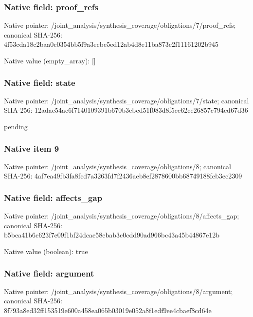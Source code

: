 \documentclass[10pt,a4paper]{article}
\begin{document}
\subsubsection{Native field: proof\_\allowbreak{}refs}
Native pointer: /joint\_\allowbreak{}analysis/synthesis\_\allowbreak{}coverage/obligations/7/proof\_\allowbreak{}refs; canonical SHA-256: 4f53cda18c2baa0c0354bb5f9a3ecbe5ed12ab4d8e11ba873c2f11161202b945

Native value (empty\_\allowbreak{}array): []

\subsubsection{Native field: state}
Native pointer: /joint\_\allowbreak{}analysis/synthesis\_\allowbreak{}coverage/obligations/7/state; canonical SHA-256: 12adac54ac6f7140109391b670b3cbcd51f083d8f5ee62ce26857c794ed67d36

\begingroup\raggedright\sloppy pending\par\endgroup

\subsubsection{Native item 9}
Native pointer: /joint\_\allowbreak{}analysis/synthesis\_\allowbreak{}coverage/obligations/8; canonical SHA-256: 4af7ea49fb3fa8fcd7a3263fd7f2436aeb8ef2878600bb68749188feb3ec2309

\subsubsection{Native field: affects\_\allowbreak{}gap}
Native pointer: /joint\_\allowbreak{}analysis/synthesis\_\allowbreak{}coverage/obligations/8/affects\_\allowbreak{}gap; canonical SHA-256: b5bea41b6c623f7c09f1bf24dcae58ebab3c0cdd90ad966bc43a45b44867e12b

Native value (boolean): true

\subsubsection{Native field: argument}
Native pointer: /joint\_\allowbreak{}analysis/synthesis\_\allowbreak{}coverage/obligations/8/argument; canonical SHA-256: 8f793a8ed32ff153519e600a458ea065b03019e052a8f1edf9ee4cbaef8cd64e
\end{document}
